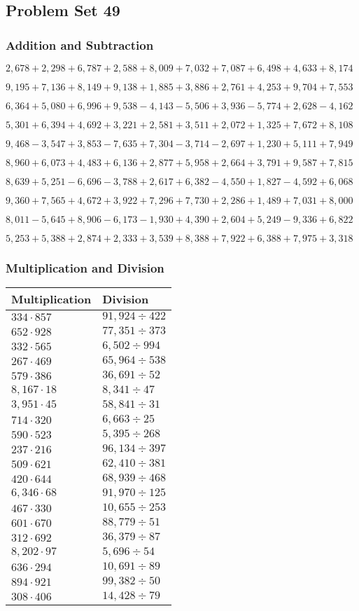 \hypertarget{problem-set-49-2}{%
\subsection{Problem Set 49}\label{problem-set-49-2}}

\hypertarget{addition-and-subtraction-211}{%
\subsubsection{Addition and
Subtraction}\label{addition-and-subtraction-211}}

\(2,678+2,298+6,787+2,588+8,009+7,032+7,087+6,498+4,633+ 8,174\)

\(9,195+7,136+8,149+9,138+1,885+3,886+2,761+4,253+9,704+7,553\)

\(6,364+5,080+6,996+9,538-4,143-5,506+3,936-5,774+2,628-4,162\)

\(5,301+6,394+4,692+3,221+2,581+3,511+2,072+1,325+7,672+8,108\)

\(9,468-3,547+3,853-7,635+7,304-3,714-2,697+1,230+5,111+7,949\)

\(8,960+6,073+4,483+6,136+2,877+5,958+2,664+3,791+9,587+7,815\)

\(8,639+5,251-6,696-3,788+2,617+6,382-4,550+1,827-4,592+6,068\)

\(9,360+7,565+4,672+3,922+7,296+7,730+2,286+1,489+7,031+8,000\)

\(8,011-5,645+8,906-6,173-1,930+4,390+2,604+5,249-9,336+6,822\)

\(5,253+5,388+2,874+2,333+3,539+8,388+7,922+6,388+7,975+3,318\)

\hypertarget{multiplication-and-division-210}{%
\subsubsection{Multiplication and
Division}\label{multiplication-and-division-210}}

\begin{longtable}[]{@{}ll@{}}
\toprule
Multiplication & Division\tabularnewline
\midrule
\endhead
\(334\cdot857\) & \(91,924÷422\)\tabularnewline
\(652\cdot928\) & \(77,351÷373\)\tabularnewline
\(332\cdot565\) & \(6,502÷994\)\tabularnewline
\(267\cdot469\) & \(65,964÷538\)\tabularnewline
\(579\cdot386\) & \(36,691÷52\)\tabularnewline
\(8,167\cdot18\) & \(8,341÷47\)\tabularnewline
\(3,951\cdot45\) & \(58,841÷31\)\tabularnewline
\(714\cdot320\) & \(6,663÷25\)\tabularnewline
\(590\cdot523\) & \(5,395÷268\)\tabularnewline
\(237\cdot216\) & \(96,134÷397\)\tabularnewline
\(509\cdot621\) & \(62,410÷381\)\tabularnewline
\(420\cdot644\) & \(68,939÷468\)\tabularnewline
\(6,346\cdot68\) & \(91,970÷125\)\tabularnewline
\(467\cdot330\) & \(10,655÷253\)\tabularnewline
\(601\cdot670\) & \(88,779÷51\)\tabularnewline
\(312\cdot692\) & \(36,379÷87\)\tabularnewline
\(8,202\cdot97\) & \(5,696÷54\)\tabularnewline
\(636\cdot294\) & \(10,691÷89\)\tabularnewline
\(894\cdot921\) & \(99,382÷50\)\tabularnewline
\(308\cdot406\) & \(14,428÷79\)\tabularnewline
\bottomrule
\end{longtable}

